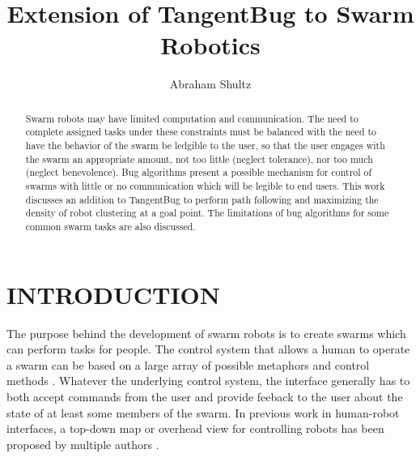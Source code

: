 \documentclass[letterpaper, 10 pt, conference]{ieeeconf}  %
\title{\LARGE \bf
Extension of TangentBug to Swarm Robotics
}
\author{Abraham Shultz%
}
\begin{document}
\maketitle
\thispagestyle{empty}
\pagestyle{empty}


\begin{abstract}

Swarm robots may have limited computation and communication. The need to complete assigned tasks under these constraints must be balanced with the need to have the behavior of the swarm be ledgible to the user, so that the user engages with the swarm an appropriate amount, not too little (neglect tolerance), nor too much (neglect benevolence). Bug algorithms present a possible mechanism for control of swarms with little or no communication which will be legible to end users. This work discusses an addition to TangentBug to perform path following and maximizing the density of robot clustering at a goal point. The limitations of bug algorithms for some common swarm tasks are also discussed. 

\end{abstract}


\section{INTRODUCTION}

The purpose behind the development of swarm robots is to create swarms which can perform tasks for people. 
The control system that allows a human to operate a swarm can be based on a large array of possible metaphors and control methods \cite{kolling2016human}.
Whatever the underlying control system, the interface generally has to both accept commands from the user and provide feeback to the user about the state of at least some members of the swarm. 
In previous work in human-robot interfaces, a top-down map or overhead view for controlling robots has been proposed by multiple authors \cite{parasuraman2005flexible, bashyal2008human, Micire:2009:ANG:1731903.1731912,  diaz2017human}.
\end{document}
